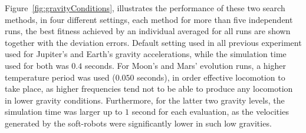 Figure~\ref{fig:gravityConditions}, illustrates the performance of these two search methods, in four different settings, each method for more than five independent runs, the best fitness achieved by an individual averaged for all runs are shown together with the deviation errors. Default setting used in all previous experiment used for Jupiter's and Earth's gravity accelerations, while the simulation time used for both was $0.4$ seconds. For Moon's and Mars' evolution runs, a higher temperature period was used ($0.050$ seconds), in order effective locomotion to take place, as higher frequencies tend not to be able to  produce any locomotion in lower gravity conditions. Furthermore, for the latter two gravity levels, the simulation time was larger up to $1$ second for each evaluation, as the velocities generated by the soft-robots were significantly lower in such low gravities.

